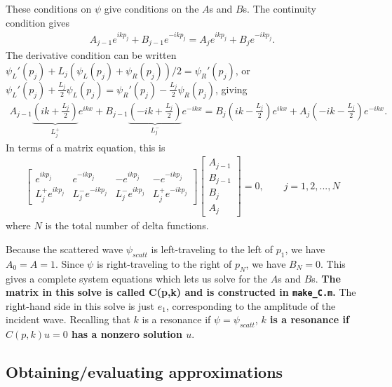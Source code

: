 \documentclass[letterpaper,12pt]{article}
\begin{document}
These conditions on $\psi$ give conditions on the $A$s and $B$s. The
continuity condition gives
\begin{align*}
A_{j-1}e^{ikp_j} + B_{j-1}e^{-ikp_j} = A_je^{ikp_j} + B_je^{-ikp_j}.
\end{align*}
The derivative condition can be written $\psi_L'(p_j) + L_j 
(\psi_L(p_j) + \psi_R(p_j))/2 = \psi_R'(p_j)$, or
$\psi_L'(p_j) + \frac{L_j}{2}\psi_L(p_j) = \psi_R'(p_j) 
- \frac{L_j}{2}\psi_R(p_j)$, giving
\begin{align*}
A_{j-1}\underbrace{\left( ik + \frac{L_j}{2}\right)}_{L_j^{+}}e^{ikx} + 
B_{j-1}\underbrace{\left(-ik + \frac{L_j}{2}\right)}_{L_j^{-}}e^{-ikx} = 
B_j\left( ik - \frac{L_j}{2}\right)e^{ikx} +
A_j\left(-ik - \frac{L_j}{2}\right)e^{-ikx}.
\end{align*}
In terms of a matrix equation, this is
\begin{align*}
 \begin{bmatrix}
  e^{ikp_j} & e^{-ikp_j} & -e^{ikp_j} & -e^{-ikp_j}\\ 
  L_j^{+}e^{ikp_j} & L_j^{-}e^{-ikp_j} & L_j^{-}e^{ikp_j} & L_j^{+}e^{-ikp_j}
 \end{bmatrix}
 \begin{bmatrix}A_{j-1}\\ B_{j-1}\\ B_j\\ A_j\end{bmatrix}
 = 0,\qquad j = 1,2,...,N
\end{align*}
where $N$ is the total number of delta functions.

Because the scattered wave $\psi_{scatt}$ is left-traveling to the 
left of $p_1$, we
have $A_0 = A = 1$. Since $\psi$ is right-traveling to the right
of $p_N$, we have $B_N = 0$. This gives a complete system equations
which lets us solve for the $A$s and $B$s. {\bf The matrix in this
solve is called C(p,k) and is constructed in \texttt{make\_C.m}.}
The right-hand side in this solve is just $e_1$, corresponding to
the amplitude of the incident wave. Recalling that $k$ is a 
resonance if $\psi = \psi_{scatt}$, {\bf $k$ is a resonance if
$C(p,k)u = 0$ has a nonzero solution $u$}.

\subsection*{Obtaining/evaluating approximations}
\end{document}
